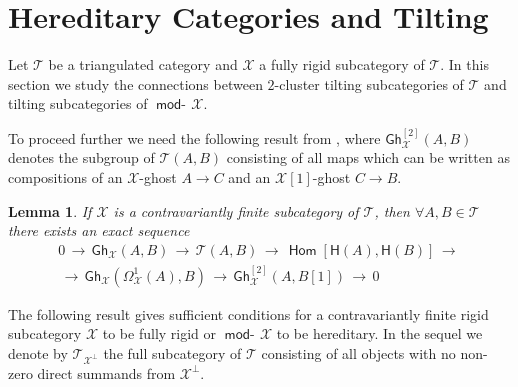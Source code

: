 \documentclass[oneside, a4paper,reqno]{amsart}
\numberwithin{equation}{section}
\newtheorem{lem}[thm]{Lemma}
\theoremstyle{definition}
\begin{document}
\section{Hereditary Categories and Tilting} 

Let ${\mathcal T}$ be a triangulated category and ${\mathcal X}$ a fully rigid subcategory of ${\mathcal T}$. In this section we study the connections between $2$-cluster tilting subcategories of ${\mathcal T}$ and tilting subcategories of $\operatorname*{\mathsf{mod}-\!}{\mathcal X}$.

  To proceed further we need the following result from \cite{B}, where $\mathsf{Gh}^{[2]}_{\mathcal X}(A,B)$ denotes the subgroup of ${\mathcal T}(A,B)$ consisting of all maps which can be written as compositions of an ${\mathcal X}$-ghost $A {\longrightarrow} C$ and an ${\mathcal X}[1]$-ghost $C {\longrightarrow} B$. 
  
  

\begin{lem} \cite{B} If ${\mathcal X}$ is a contravariantly finite subcategory of ${\mathcal T}$, then $\forall A, B \in {\mathcal T}$ there exists an exact sequence
\begin{multline}
0 \, {\longrightarrow} \, \mathsf{Gh}_{\mathcal X}(A,B) \,  {\longrightarrow} \, {\mathcal T}(A,B) \, {\longrightarrow} \, \operatorname{\mathsf{Hom}}[\mathsf{H}(A),\mathsf{H}(B)] \, {\longrightarrow} \, \\ 
\, {\longrightarrow} \,   \mathsf{Gh}_{\mathcal X}(\Omega^{1}_{\mathcal X}(A),B)  \, {\longrightarrow} \, \mathsf{Gh}^{[2]}_{\mathcal X}(A,B[1]) \, {\longrightarrow} \, 0
\end{multline}
\end{lem} 

The following result gives sufficient conditions for a contravariantly finite rigid subcategory ${\mathcal X}$ to be fully rigid or $\operatorname*{\mathsf{mod}-\!}{\mathcal X}$ to be hereditary. In the sequel we denote by ${\mathcal T}_{{\mathcal X}^{\bot}}$ the full subcategory of ${\mathcal T}$ consisting of all objects with no non-zero direct summands from ${\mathcal X}^{\bot}$. 
\end{document}
